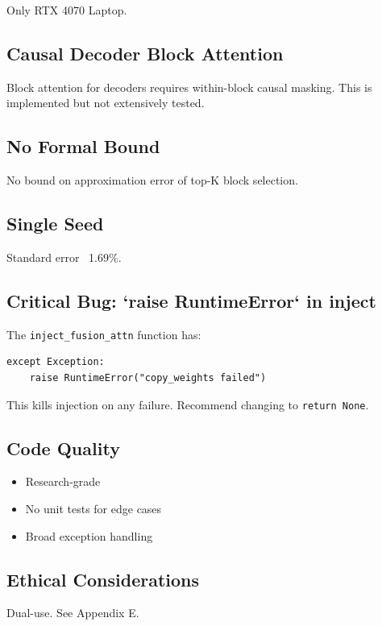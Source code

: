 Only RTX 4070 Laptop.

\subsection{Causal Decoder Block Attention}

Block attention for decoders requires within-block causal masking. This is 
implemented but not extensively tested.

\subsection{No Formal Bound}

No bound on approximation error of top-K block selection.

\subsection{Single Seed}

Standard error ~1.69\%.

\subsection{Critical Bug: `raise RuntimeError` in inject}

The \texttt{inject\_fusion\_attn} function has:

\begin{lstlisting}
except Exception:
    raise RuntimeError("copy_weights failed")
\end{lstlisting}

This kills injection on any failure. Recommend changing to \texttt{return None}.

\subsection{Code Quality}

\begin{itemize}
\item Research-grade
\item No unit tests for edge cases
\item Broad exception handling

\end{itemize}
\subsection{Ethical Considerations}

Dual-use. See Appendix E.

